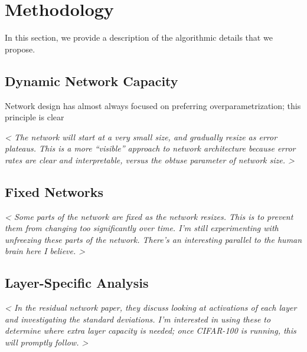 \chapter{Methodology}
In this section, we provide a description of the algorithmic details that we propose.

\section{Dynamic Network Capacity}
Network design has almost always focused on preferring overparametrization; this principle is clear 

\emph{ < The network will start at a very small size, and gradually resize as error plateaus. This is a more ``visible'' approach to network architecture because error rates are clear and interpretable, versus the obtuse parameter of network size. > }





\section{Fixed Networks}

\emph{ < Some parts of the network are fixed as the network resizes. This is to prevent them from changing too significantly over time. I'm still experimenting with unfreezing these parts of the network. There's an interesting parallel to the human brain here I believe. > }

\section{Layer-Specific Analysis}

\emph{ < In the residual network paper, they discuss looking at activations of each layer and investigating the standard deviations. I'm interested in using these to determine where extra layer capacity is needed; once CIFAR-100 is running, this will promptly follow. > }
